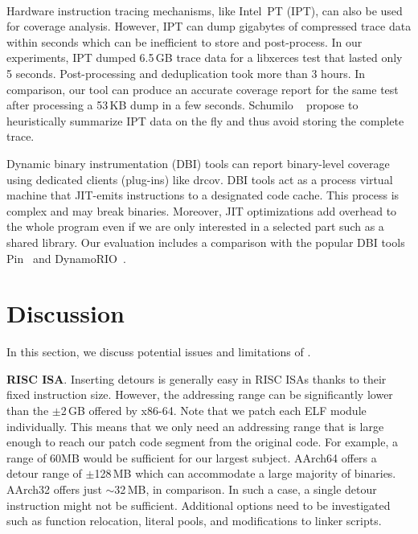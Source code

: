 Hardware instruction tracing mechanisms, like Intel\textsuperscript{\textregistered}~PT (IPT), can also be used for coverage analysis.
However, IPT can dump gigabytes of compressed trace data within seconds which can be inefficient to store and post-process.
In our experiments, IPT dumped 6.5\,GB trace data for a \textsf{libxerces} test that lasted only 5 seconds. 
Post-processing and deduplication took more than 3 hours.
In comparison, our tool can produce an accurate coverage report for the same test after processing a 53\,KB dump in a few seconds.
Schumilo {\etal}~\cite{kAFL:Schumilo2017} propose to heuristically summarize IPT data on the fly and thus avoid storing the complete trace.

Dynamic binary instrumentation (DBI) tools can report binary-level coverage using dedicated clients (plug-ins) like \textsf{drcov}.
DBI tools act as a process virtual machine that JIT-emits instructions to a designated code cache.
This process is complex and may break binaries. 
Moreover, JIT optimizations add overhead to the whole program even if we are only interested in a selected part such as a shared library.
Our evaluation includes a comparison with the popular DBI tools  \textsf{Pin}~\cite{IntelPinWeb} and \textsf{DynamoRIO}~\cite{DynamoRIOWeb}.




\section{Discussion}
\label{sec:discussion}
In this section, we discuss potential issues and limitations of {\bcov}.

\textbf{RISC ISA}.
Inserting detours is generally easy in RISC ISAs thanks to their fixed instruction size.
However, the addressing range can be significantly lower than the $\pm$2\,GB offered by x86-64.
Note that we patch each ELF module individually.
This means that we only need an addressing range that is large enough to reach our patch code segment from the original code.
For example, a range of 60MB would be sufficient for our largest subject.
AArch64 offers a detour range of $\pm$128\,MB  which can accommodate a large majority of binaries.
AArch32 offers just $\sim$32\,MB, in comparison.
In such a case, a single detour instruction might not be sufficient.
Additional options need to be investigated such as function relocation, literal pools, and modifications to linker scripts.


